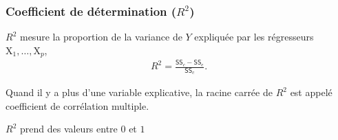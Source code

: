 \documentclass[xcolor={dvipsnames}]{beamer}
\begin{document}

\begin{frame}
\frametitle{Coefficient de détermination ($R^2$)}
\bi
\item $R^2$ mesure la proportion de la variance de $Y$ expliquée par les régresseurs $\mathrm{X}_1, \ldots, \mathrm{X}_p$,
\begin{align*}
R^2=\frac{\mathsf{SS}_c-\mathsf{SS}_e}{\mathsf{SS}_c}.                                                     \end{align*}
\item Quand il y a plus d'une variable explicative, la racine carrée de $R^2$ est appelé 
\alert{coefficient de corrélation multiple}. 
\item $R^2$ prend des valeurs entre $0$ et $1$

\ei
\end{frame}

% 
% 
% 
% 
\end{document}
